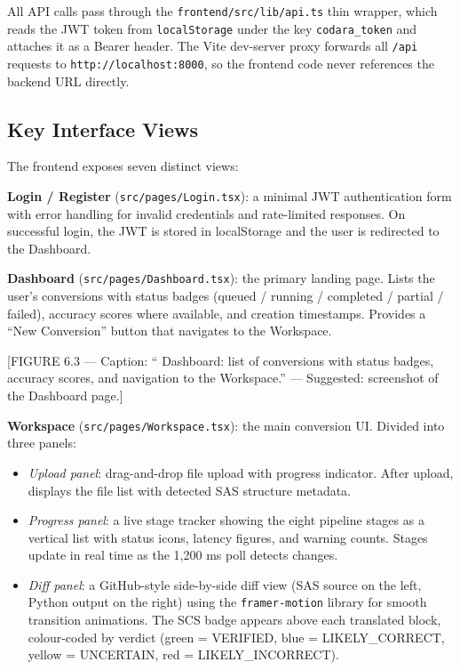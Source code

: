 All API calls pass through the \texttt{frontend/src/lib/api.ts} thin wrapper,
which reads the JWT token from \texttt{localStorage} under the key
\texttt{codara\_token} and attaches it as a Bearer header. The Vite dev-server
proxy forwards all \texttt{/api} requests to \texttt{http://localhost:8000},
so the frontend code never references the backend URL directly.

\subsection{Key Interface Views}
\label{subsec:workspace-ui}

The frontend exposes seven distinct views:

\textbf{Login / Register} (\texttt{src/pages/Login.tsx}): a minimal JWT
authentication form with error handling for invalid credentials and rate-limited
responses. On successful login, the JWT is stored in localStorage and the user
is redirected to the Dashboard.

\textbf{Dashboard} (\texttt{src/pages/Dashboard.tsx}): the primary landing
page. Lists the user's conversions with status badges (queued / running /
completed / partial / failed), accuracy scores where available, and creation
timestamps. Provides a ``New Conversion'' button that navigates to the Workspace.

[FIGURE 6.3 --- Caption: ``\codara{} Dashboard: list of conversions with
status badges, accuracy scores, and navigation to the Workspace.'' ---
Suggested: screenshot of the Dashboard page.]

\textbf{Workspace} (\texttt{src/pages/Workspace.tsx}): the main conversion
UI. Divided into three panels:
\begin{itemize}
  \item \textit{Upload panel}: drag-and-drop file upload with progress indicator.
    After upload, displays the file list with detected SAS structure metadata.
  \item \textit{Progress panel}: a live stage tracker showing the eight
    pipeline stages as a vertical list with status icons, latency figures, and
    warning counts. Stages update in real time as the 1,200 ms poll detects
    changes.
  \item \textit{Diff panel}: a GitHub-style side-by-side diff view
    (SAS source on the left, Python output on the right) using the
    \texttt{framer-motion} library for smooth transition animations. The SCS
    badge appears above each translated block, colour-coded by verdict
    (green = VERIFIED, blue = LIKELY\_CORRECT, yellow = UNCERTAIN,
    red = LIKELY\_INCORRECT).
\end{itemize}

